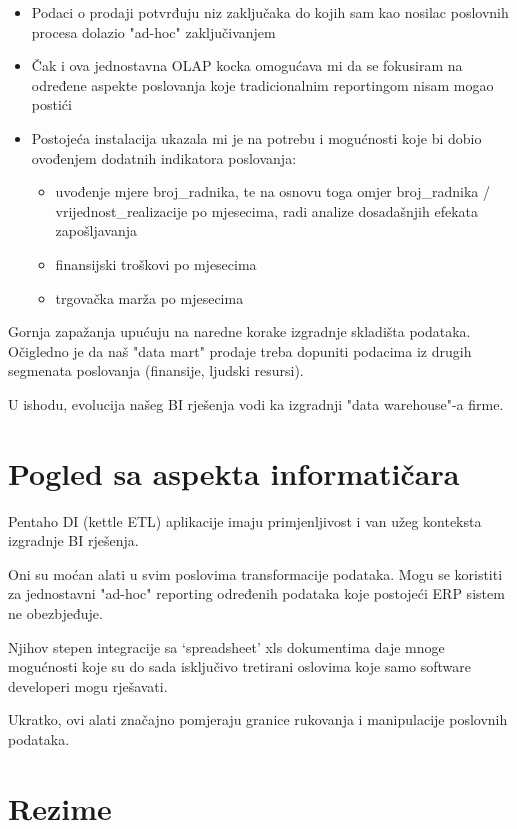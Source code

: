 \documentclass[times, utf8, seminar]{fit}
\begin{document}
\begin{itemize}
 \item Podaci o prodaji potvrđuju niz zaključaka do kojih sam kao nosilac poslovnih procesa dolazio "ad-hoc" zaključivanjem  
 \item Čak i ova jednostavna OLAP kocka omogućava mi da se fokusiram na određene aspekte poslovanja koje tradicionalnim reportingom nisam mogao postići
 \item Postojeća instalacija ukazala mi je na potrebu i mogućnosti koje bi dobio ovođenjem dodatnih indikatora poslovanja:
 \begin{itemize}
   \item uvođenje mjere broj\_radnika, te na osnovu toga omjer broj\_radnika / vrijednost\_realizacije po mjesecima, radi analize dosadašnjih efekata zapošljavanja
   \item finansijski troškovi po mjesecima
   \item trgovačka marža po mjesecima
 \end{itemize} 
\end{itemize}

Gornja zapažanja upućuju na naredne korake izgradnje skladišta podataka. Očigledno je da naš "data mart" prodaje treba dopuniti podacima iz drugih segmenata poslovanja (finansije, ljudski resursi). 

U ishodu, evolucija našeg BI rješenja vodi ka izgradnji "data warehouse"-a firme.

\section{Pogled sa aspekta informatičara}

Pentaho DI (kettle ETL) aplikacije imaju primjenljivost i van užeg konteksta izgradnje BI rješenja.

Oni su moćan alati u svim poslovima transformacije podataka. Mogu se koristiti za jednostavni "ad-hoc" reporting određenih podataka koje postojeći ERP sistem ne obezbjeđuje.

Njihov stepen integracije sa `spreadsheet' xls dokumentima daje mnoge mogućnosti koje su do sada isključivo tretirani oslovima koje samo software developeri mogu rješavati.

Ukratko, ovi alati značajno pomjeraju granice rukovanja i manipulacije poslovnih podataka.

\section{Rezime}
\end{document}
